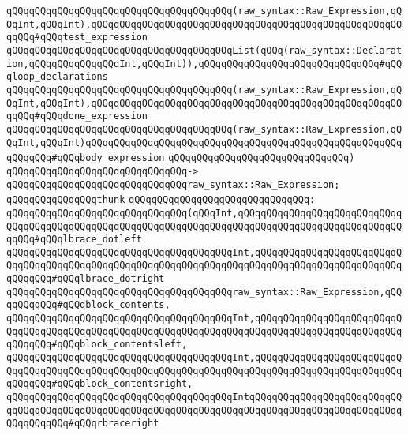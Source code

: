 \verb|qQQqqQQqqQQqqQQqqQQqqQQqqQQqqQQqqQQqqQQq(raw_syntax::Raw_Expression,qQQqInt,qQQqInt),qQQqqQQqqQQqqQQqqQQqqQQqqQQqqQQqqQQqqQQqqQQqqQQqqQQqqQQqqQQq#qQQqtest_expression|\newline
\verb|qQQqqQQqqQQqqQQqqQQqqQQqqQQqqQQqqQQqqQQqList(qQQq(raw_syntax::Declaration,qQQqqQQqqQQqqQQqInt,qQQqInt)),qQQqqQQqqQQqqQQqqQQqqQQqqQQqqQQq#qQQqloop_declarations|\newline
\verb|qQQqqQQqqQQqqQQqqQQqqQQqqQQqqQQqqQQqqQQq(raw_syntax::Raw_Expression,qQQqInt,qQQqInt),qQQqqQQqqQQqqQQqqQQqqQQqqQQqqQQqqQQqqQQqqQQqqQQqqQQqqQQqqQQq#qQQqdone_expression|\newline
\verb|qQQqqQQqqQQqqQQqqQQqqQQqqQQqqQQqqQQqqQQq(raw_syntax::Raw_Expression,qQQqInt,qQQqInt)qQQqqQQqqQQqqQQqqQQqqQQqqQQqqQQqqQQqqQQqqQQqqQQqqQQqqQQqqQQqqQQq#qQQqbody_expression|\newline
\verb|qQQqqQQqqQQqqQQqqQQqqQQqqQQqqQQq)|\newline
\verb|qQQqqQQqqQQqqQQqqQQqqQQqqQQqqQQq->|\newline
\verb|qQQqqQQqqQQqqQQqqQQqqQQqqQQqqQQqraw_syntax::Raw_Expression;|\newline
\newline
\verb|qQQqqQQqqQQqqQQqthunk|\newline
\verb|qQQqqQQqqQQqqQQqqQQqqQQqqQQqqQQq:|\newline
\verb|qQQqqQQqqQQqqQQqqQQqqQQqqQQqqQQq(qQQqInt,qQQqqQQqqQQqqQQqqQQqqQQqqQQqqQQqqQQqqQQqqQQqqQQqqQQqqQQqqQQqqQQqqQQqqQQqqQQqqQQqqQQqqQQqqQQqqQQqqQQqqQQq#qQQqlbrace_dotleft|\newline
\verb|qQQqqQQqqQQqqQQqqQQqqQQqqQQqqQQqqQQqqQQqInt,qQQqqQQqqQQqqQQqqQQqqQQqqQQqqQQqqQQqqQQqqQQqqQQqqQQqqQQqqQQqqQQqqQQqqQQqqQQqqQQqqQQqqQQqqQQqqQQqqQQqqQQq#qQQqlbrace_dotright|\newline
\verb|qQQqqQQqqQQqqQQqqQQqqQQqqQQqqQQqqQQqqQQqraw_syntax::Raw_Expression,qQQqqQQqqQQq#qQQqblock_contents,|\newline
\verb|qQQqqQQqqQQqqQQqqQQqqQQqqQQqqQQqqQQqqQQqInt,qQQqqQQqqQQqqQQqqQQqqQQqqQQqqQQqqQQqqQQqqQQqqQQqqQQqqQQqqQQqqQQqqQQqqQQqqQQqqQQqqQQqqQQqqQQqqQQqqQQqqQQq#qQQqblock_contentsleft,|\newline
\verb|qQQqqQQqqQQqqQQqqQQqqQQqqQQqqQQqqQQqqQQqInt,qQQqqQQqqQQqqQQqqQQqqQQqqQQqqQQqqQQqqQQqqQQqqQQqqQQqqQQqqQQqqQQqqQQqqQQqqQQqqQQqqQQqqQQqqQQqqQQqqQQqqQQq#qQQqblock_contentsright,|\newline
\verb|qQQqqQQqqQQqqQQqqQQqqQQqqQQqqQQqqQQqqQQqIntqQQqqQQqqQQqqQQqqQQqqQQqqQQqqQQqqQQqqQQqqQQqqQQqqQQqqQQqqQQqqQQqqQQqqQQqqQQqqQQqqQQqqQQqqQQqqQQqqQQqqQQqqQQq#qQQqrbraceright|\newline
